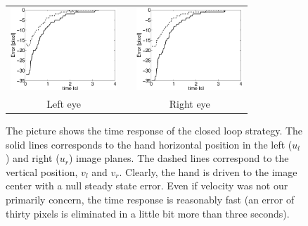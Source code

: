 {\begin{figure}
  \begin{center}
	\begin{tabular}{ccc}
	  \parbox{40mm}{\includegraphics[width=40mm]{Figure/TimeReponseLeftClosedLoop.eps}}  & \hspace{2cm} &
	  \parbox{40mm}{\includegraphics[width=40mm]{Figure/TimeReponseRightClosedLoop.eps}}
	  \\
	  \parbox{40mm}{\centering Left eye } & \hspace{2cm} & \parbox{40mm}{\centering Right eye }
  \end{tabular}
\end{center}
\caption{The picture shows the time response of the closed loop strategy. The solid lines corresponds to the hand horizontal position in the left ($u_l$) and right ($u_r$) image planes. The dashed lines correspond to the vertical position, $v_l$ and $v_r$. Clearly, the hand is driven to the image center with a null steady state error. Even if velocity was not our primarily concern, the time response is reasonably fast (an error of thirty pixels is eliminated in a little bit more than three seconds). }\label{Fig:TimeResponseClosedLoopErrors}
  \end{figure}


}

